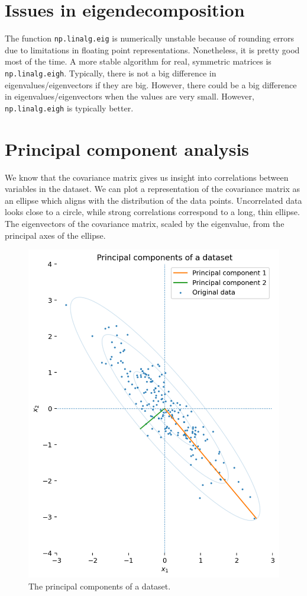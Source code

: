 \documentclass[a4paper, openany]{memoir}
\begin{document}
    \section{Issues in eigendecomposition}
    The function \texttt{np.linalg.eig} is numerically unstable because of rounding errors due to limitations in floating point representations. Nonetheless, it is pretty good most of the time. A more stable algorithm for real, symmetric matrices is \texttt{np.linalg.eigh}. Typically, there is not a big difference in eigenvalues/eigenvectors if they are big. However, there could be a big difference in eigenvalues/eigenvectors when the values are very small. However, \texttt{np.linalg.eigh} is typically better.

    \section{Principal component analysis}
    We know that the covariance matrix gives us insight into correlations between variables in the dataset. We can plot a representation of the covariance matrix as an ellipse which aligns with the distribution of the data points. Uncorrelated data looks close to a circle, while strong correlations correspond to a long, thin ellipse. The eigenvectors of the covariance matrix, scaled by the eigenvalue, from the principal axes of the ellipse.
    \begin{figure}[H]
        \centering
        \includegraphics[scale=0.6]{src/3.29 Principal components of a dataset.png}
        \caption{The principal components of a dataset.}
    \end{figure}
\end{document}
